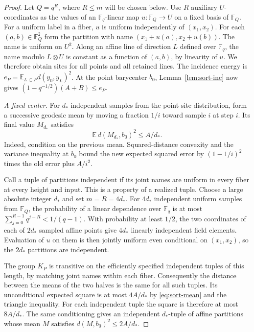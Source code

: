 \begin{proof}
Let $Q=q^R$, where $R\le m$ will be chosen below. Use $R$ auxiliary
$U$-coordinates as the values of an $\mathbb F_q$-linear map
$u:\mathbb F_Q\to U$ on a fixed basis of $\mathbb F_Q$. For a uniform
label in a fiber, $u$ is uniform independently of $(x_1,x_2)$. For
each $(a,b)\in\mathbb F_Q^2$ form the partition with name
$(x_1+u(a),x_2+u(b))$. The name is uniform on $U^2$. Along an affine
line of direction $L$ defined over $\mathbb F_q$, the name modulo
$L\otimes U$ is constant as a function of $(a,b)$, by linearity of
$u$. We therefore obtain sites for all points and all retained lines.
The incidence energy is $e_P=\mathbb E_{L\subset P}d(y_0,y_L)^2$.
At the point barycenter $b_0$, Lemma~\ref{lem:sort-inc} now gives
$(1-q^{-1/2})(A+B)\le e_P$.

\smallskip\noindent
\emph{A fixed center.}
For $d_*$ independent samples from the point-site distribution, form
a successive geodesic mean by moving a fraction $1/i$ toward sample
$i$ at step $i$. Its final value $M_{d_*}$ satisfies
\begin{equation}\label{eq:sort-mean}
                  \mathbb E\,d(M_{d_*},b_0)^2\le A/d_*.
\end{equation}
Indeed, condition on the previous mean. Squared-distance convexity
and the variance inequality at $b_0$ bound the new expected squared
error by $(1-1/i)^2$ times the old error plus $A/i^2$.

Call a tuple of partitions independent if its joint names are uniform
in every fiber at every height and input. This is a property of a
realized tuple. Choose a large absolute integer $d_*$ and set $m=R=4d_*$.
For $4d_*$ independent uniform samples from $\mathbb F_Q$, the probability
of a linear dependence over $\mathbb F_q$ is at most
$\sum_{j=0}^{R-1}q^{j-R}<1/(q-1)$. With probability at least $1/2$, the
two coordinates of each of $2d_*$ sampled affine points give $4d_*$
linearly independent field elements. Evaluation of $u$ on them is
then jointly uniform even conditional on $(x_1,x_2)$, so the $2d_*$
partitions are independent.

The group $K_P$ is transitive on the efficiently specified independent
tuples of this length, by matching joint names within each fiber.
Consequently the distance between the means of the two halves is the
same for all such tuples. Its unconditional expected square is at most
$4A/d_*$ by \eqref{eq:sort-mean} and the triangle inequality. For
each independent tuple the square is therefore at most $8A/d_*$.
The same conditioning gives an independent $d_*$-tuple of affine
partitions whose mean $M$ satisfies $d(M,b_0)^2\le2A/d_*$.


\end{proof}
